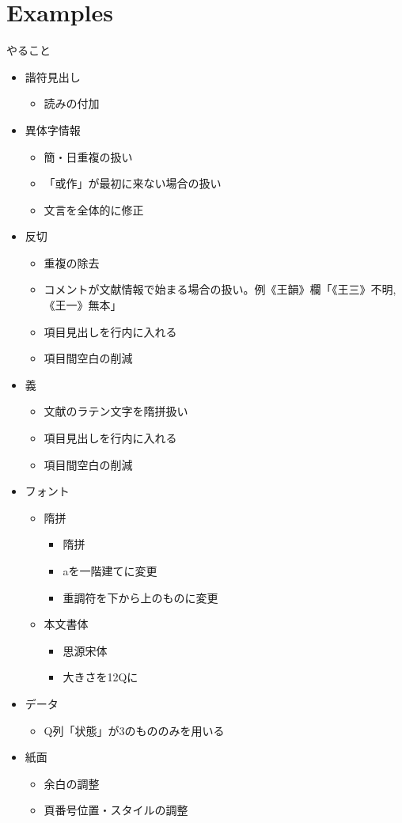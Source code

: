 \documentclass[a5paper]{article}
\begin{document}
\part{Examples}
やること
\begin{itemize}
\item{} 諧符見出し
  \begin{itemize}
  \item{} 読みの付加
  \end{itemize}
\item{} 異体字情報
  \begin{itemize}
  \item{} 簡・日重複の扱い
  \item{} 「或作」が最初に来ない場合の扱い
  \item{} 文言を全体的に修正
  \end{itemize}
\item{} 反切
  \begin{itemize}
  \item{} 重複の除去
  \item{} コメントが文献情報で始まる場合の扱い。例《王韻》欄「《王三》不明,《王一》無本」
  \item{} 項目見出しを行内に入れる
  \item{} 項目間空白の削減
  \end{itemize}
\item{} 義
  \begin{itemize}
  \item{} 文献のラテン文字を隋拼扱い
  \item{} 項目見出しを行内に入れる
  \item{} 項目間空白の削減
  \end{itemize}
\item{} フォント
  \begin{itemize}
  \item{} 隋拼
    \begin{itemize}
    \item{} 隋拼
    \item{} aを一階建てに変更
    \item{} 重調符を下から上のものに変更
    \end{itemize}
  \item{} 本文書体
    \begin{itemize}
    \item{} 思源宋体
    \item{} 大きさを12Qに
    \end{itemize}
  \end{itemize}
\item{} データ
  \begin{itemize}
  \item{} Q列「状態」が3のもののみを用いる
  \end{itemize}
\item{} 紙面
  \begin{itemize}
  \item{} 余白の調整
  \item{} 頁番号位置・スタイルの調整
  \end{itemize}
\end{itemize}
\end{document}
